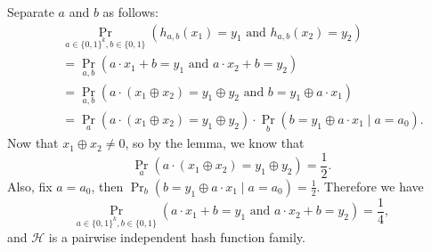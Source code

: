 \documentclass{homework}
\begin{document}
\begin{solution}
  Separate $a$ and $b$ as follows:
  \begin{align*}
    \quad & \Pr_{a \in \{0, 1\}^k, b \in \{0, 1\}}(h_{a, b}(x_1) = y_1 \text{ and } h_{a, b}(x_2) = y_2) \\
    & = \Pr_{a, b}(a \cdot x_1 + b = y_1 \text{ and } a \cdot x_2 + b = y_2) \\
    & = \Pr_{a, b}(a \cdot (x_1 \oplus x_2) = y_1 \oplus y_2 \text{ and } b = y_1 \oplus a\cdot x_1) \\
    & = \Pr_{a}(a \cdot (x_1 \oplus x_2) = y_1 \oplus y_2) \cdot \Pr_{b}(b = y_1 \oplus a \cdot x_1 \mid a = a_0).
  \end{align*}
  Now that $x_1 \oplus x_2 \neq 0$, so by the lemma, we know that
  \begin{equation*}
    \Pr_{a}(a \cdot (x_1 \oplus x_2) = y_1 \oplus y_2) = \frac{1}{2}.
  \end{equation*}
  Also, fix $a = a_0$, then $\Pr_{b}(b = y_1 \oplus a \cdot x_1 \mid a = a_0) = \frac{1}{2}$.
  Therefore we have
  \begin{equation*}
    \Pr_{a \in \{0, 1\}^k, b \in \{0, 1\}}(a \cdot x_1 + b = y_1
    \text{ and } a \cdot x_2 + b = y_2) = \frac{1}{4},
  \end{equation*}
  and $\mathcal{H}$ is a pairwise independent hash function family.

\end{solution}
\end{document}
